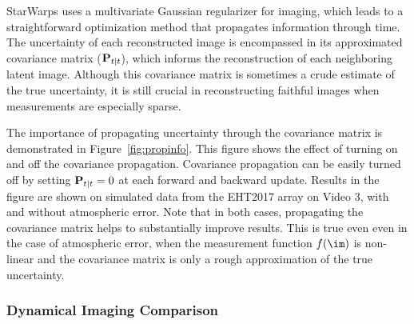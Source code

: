 StarWarps uses a multivariate Gaussian regularizer for imaging, which leads to a straightforward optimization method that propagates information through time. The uncertainty of each reconstructed image is encompassed in its approximated covariance matrix (${\bf P}_{t|t}$), which informs the reconstruction of each neighboring latent image. Although this covariance matrix is sometimes a crude estimate of the true uncertainty, it is still crucial in reconstructing faithful images when measurements are especially sparse.

The importance of propagating uncertainty through the covariance matrix is demonstrated in Figure~\ref{fig:propinfo}. This figure shows the effect of turning on and off the covariance propagation. Covariance propagation can be easily turned off by setting ${\bf P}_{t|t}=0$ at each forward and backward update. Results in the figure are shown on simulated data from the EHT2017 array on Video 3, with and without atmospheric error. Note that in both cases, propagating the covariance matrix helps to substantially improve results. This is true even even in the case of atmospheric error, when the measurement function $f(\im)$ is non-linear and the covariance matrix is only a rough approximation of the true uncertainty. 





\subsubsection{Dynamical Imaging Comparison}



